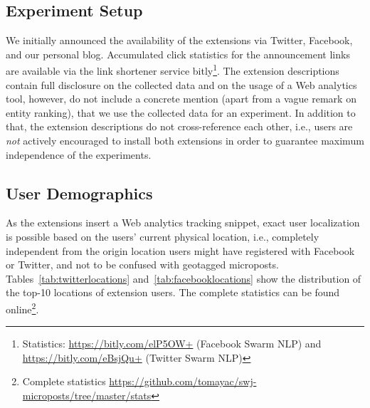 \documentclass{iosart2c}
\begin{document}
\subsection{Experiment Setup}
We initially announced the availability of the extensions via Twitter, Facebook, and our personal blog.
Accumulated click statistics for the announcement links are available via the link shortener service bitly\footnote{Statistics: \url{https://bitly.com/elP5OW+} (Facebook Swarm NLP) and \url{https://bitly.com/eBsjQu+} (Twitter Swarm NLP)}.
The extension descriptions contain full disclosure on the collected data and on the usage of a Web analytics tool, however, do not include a concrete mention (apart from a vague remark on entity ranking), that we use the collected data for an experiment.
In addition to that, the extension descriptions do not cross-reference each other, i.e., users are \emph{not} actively encouraged to install both extensions in order to guarantee maximum independence of the experiments.

\subsection{User Demographics} 
As the extensions insert a Web analytics tracking snippet, exact user localization is possible based on the users' current physical location, i.e., completely independent from the origin location users might have registered with Facebook or Twitter, and not to be confused with geotagged microposts.
Tables~\ref{tab:twitterlocations} and~\ref{tab:facebooklocations} show the distribution of the top-10 locations of extension users. 
The complete statistics can be found online\footnote{Complete statistics \url{https://github.com/tomayac/swj-microposts/tree/master/stats}}.
\end{document}
